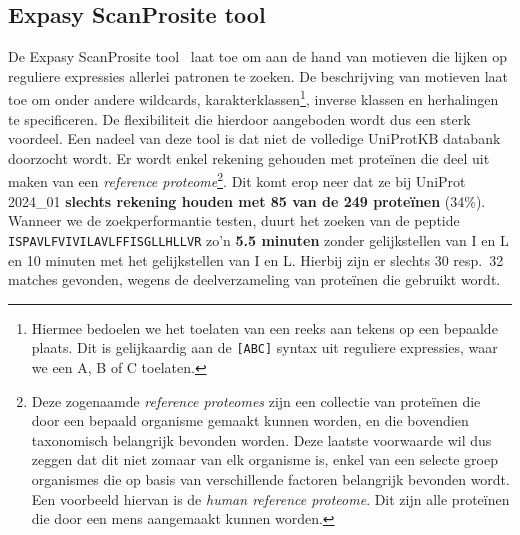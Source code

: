 \subsection{Expasy ScanProsite tool}
De Expasy ScanProsite tool~\cite{scanprosite} laat toe om aan de hand van motieven die lijken op reguliere expressies allerlei patronen te zoeken.
De beschrijving van motieven laat toe om onder andere wildcards, karakterklassen\footnote{Hiermee bedoelen we het toelaten van een reeks aan tekens op een bepaalde plaats. Dit is gelijkaardig aan de \texttt{[ABC]} syntax uit reguliere expressies, waar we een A, B of C toelaten.}, inverse klassen en herhalingen te specificeren.
De flexibiliteit die hierdoor aangeboden wordt dus een sterk voordeel.
Een nadeel van deze tool is dat niet de volledige UniProtKB databank doorzocht wordt.
Er wordt enkel rekening gehouden met proteïnen die deel uit maken van een \textit{reference proteome}\footnote{Deze zogenaamde \textit{reference proteomes} zijn een collectie van proteïnen die door een bepaald organisme gemaakt kunnen worden, en die bovendien taxonomisch belangrijk bevonden worden. Deze laatste voorwaarde wil dus zeggen dat dit niet zomaar van elk organisme is, enkel van een selecte groep organismes die op basis van verschillende factoren belangrijk bevonden wordt. Een voorbeeld hiervan is de \textit{human reference proteome}. Dit zijn alle proteïnen die door een mens aangemaakt kunnen worden.}.
Dit komt erop neer dat ze bij UniProt 2024\_01 \textbf{slechts rekening houden met 85 van de 249 proteïnen} (34\%).
Wanneer we de zoekperformantie testen, duurt het zoeken van de peptide \texttt{ISPAVLFVIVILAVLFFISGLLHLLVR} zo'n \textbf{5.5 minuten} zonder gelijkstellen van I en L en 10 minuten met het gelijkstellen van I en L\@.
Hierbij zijn er slechts 30 resp.~32 matches gevonden, wegens de deelverzameling van proteïnen die gebruikt wordt.

